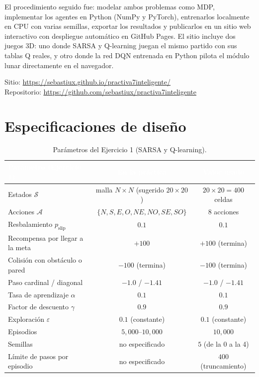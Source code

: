 \documentclass[11pt]{article}
\begin{document}
El procedimiento seguido fue: modelar ambos problemas como MDP, implementar los
agentes en Python (NumPy y PyTorch), entrenarlos localmente en CPU con varias
semillas, exportar los resultados y publicarlos en un sitio web interactivo con
despliegue automático en GitHub Pages. El sitio incluye dos juegos 3D: uno donde
SARSA y Q-learning juegan el mismo partido con sus tablas Q reales, y otro donde
la red DQN entrenada en Python pilota el módulo lunar directamente en el
navegador.

\noindent Sitio: \url{https://sebastiux.github.io/practiva7inteligente/}\\
Repositorio: \url{https://github.com/sebastiux/practiva7inteligente}

\section{Especificaciones de diseño}

\begin{table}[H]
\centering
\renewcommand{\arraystretch}{1.2}
\begin{tabular}{|l|c|c|}
\hline
\rowcolor{iberoblue}\textcolor{white}{\textbf{Parámetro (Ejercicio 1)}} & \textcolor{white}{\textbf{En la práctica}} & \textcolor{white}{\textbf{Valor usado}} \\ \hline
Estados $\mathcal{S}$                  & malla $N \times N$ (sugerido $20 \times 20$) & $20 \times 20 = 400$ celdas \\ \hline
Acciones $\mathcal{A}$                 & $\{N, S, E, O, NE, NO, SE, SO\}$ & 8 acciones \\ \hline
Resbalamiento $p_{\text{slip}}$        & $0.1$                           & $0.1$ \\ \hline
Recompensa por llegar a la meta        & $+100$                          & $+100$ (termina) \\ \hline
Colisión con obstáculo o pared         & $-100$ (termina)                & $-100$ (termina) \\ \hline
Paso cardinal / diagonal               & $-1.0$ / $-1.41$                & $-1.0$ / $-1.41$ \\ \hline
Tasa de aprendizaje $\alpha$           & $0.1$                           & $0.1$ \\ \hline
Factor de descuento $\gamma$           & $0.9$                           & $0.9$ \\ \hline
Exploración $\varepsilon$              & $0.1$ (constante)               & $0.1$ (constante) \\ \hline
Episodios                              & $5{,}000$--$10{,}000$           & $10{,}000$ \\ \hline
Semillas                               & no especificado                 & $5$ (de la 0 a la 4) \\ \hline
Límite de pasos por episodio           & no especificado                 & $400$ (truncamiento) \\ \hline
\end{tabular}
\caption{Parámetros del Ejercicio 1 (SARSA y Q-learning).}
\label{tbl:especificaciones1}
\end{table}
\end{document}
